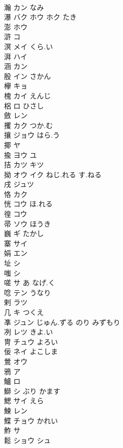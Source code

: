\documentclass[8pt]{extreport}
\begin{document}
\begin{CJK}{UTF8}{min}
\\	瀚	カン なみ			
\\	瀑	バク ホウ ホク たき			
\\	澎	ホウ			
\\	滸	コ			
\\	溟	メイ くら.い			
\\	湃	ハイ			
\\	涵	カン			
\\	殷	イン さかん			
\\	欅	キョ			
\\	槐	カイ えんじ			
\\	梠	ロ ひさし			
\\	斂	レン			
\\	攫	カク つか.む			
\\	攘	ジョウ はら.う			
\\	揶	ヤ			
\\	揄	ヨウ ユ			
\\	拮	カツ キツ			
\\	拗	オウ イク ねじ.れる す.ねる			
\\	戌	ジュツ			
\\	恪	カク			
\\	恍	コウ ほ.れる			
\\	徨	コウ			
\\	帚	ソウ ほうき			
\\	巍	ギ たかし			
\\	寨	サイ			
\\	娟	エン			
\\	址	シ			
\\	嗤	シ			
\\	嗟	サ あ なげ.く			
\\	唸	テン うなり			
\\	剌	ラツ			
\\	几	キ つくえ			
\\	凖	ジュン じゅん.ずる のり みずもり			
\\	冽	レツ きよ.い			
\\	冑	チュウ よろい			
\\	佞	ネイ よこしま			
\\	鶯	オウ			
\\	鴉	ア			
\\	鱸	ロ			
\\	鰤	シ ぶり かます			
\\	鰓	サイ えら			
\\	鰊	レン			
\\	鰈	チョウ かれい			
\\	鮓	サ			
\\	鬆	ショウ シュ			

\end{CJK}
\end{document}

